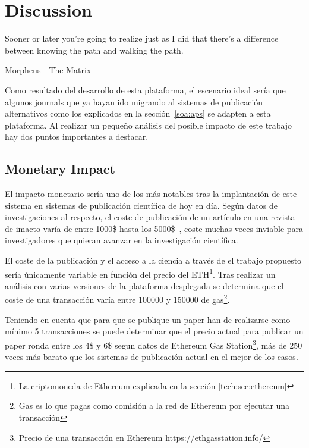 \chapter{Discussion}

\begin{FraseCelebre}
  \begin{Frase}
    Sooner or later you're going to realize just as I did that there's a
    difference between knowing the path and walking the path.
  \end{Frase}
  \begin{Fuente}
    Morpheus - The Matrix
  \end{Fuente}
\end{FraseCelebre}

Como resultado del desarrollo de esta plataforma, el escenario ideal sería que
algunos journals que ya hayan ido migrando al sistemas de publicación
alternativos como los explicados en la sección~\ref{soa:aps} se adapten a esta
plataforma. Al realizar un pequeño análisis del posible impacto de este trabajo
hay dos puntos importantes a destacar.

\section{Monetary Impact}
El impacto monetario sería uno de los más notables tras la implantación de este
sistema en sistemas de publicación científica de hoy en día. Según datos de
investigaciones al respecto, el coste de publicación de un artículo en una
revista de imacto varía de entre 1000\$ hasta los
5000\$~\cite{van2013true,russel2008business}, coste muchas veces inviable para
investigadores que quieran avanzar en la investigación científica.

El coste de la publicación y el acceso a la ciencia a través de el trabajo
propuesto sería únicamente variable en función del precio del ETH\footnote{La
  criptomoneda de Ethereum explicada en la sección \ref{tech:sec:ethereum}}.
Tras realizar un análisis con varias versiones de la plataforma desplegada se
determina que el coste de una transacción varía entre 100000 y 150000 de
gas\footnote{Gas es lo que pagas como comisión a la red de Ethereum por ejecutar
  una transacción}.

Teniendo en cuenta que para que se publique un paper han de realizarse como
mínimo 5 transacciones se puede determinar que el precio actual para publicar un
paper ronda entre los 4\$ y 6\$ segun datos de Ethereum Gas
Station\footnote{Precio de una transacción en Ethereum
  https://ethgasstation.info/}, más de 250 veces más barato que los sistemas de
publicación actual en el mejor de los casos.

